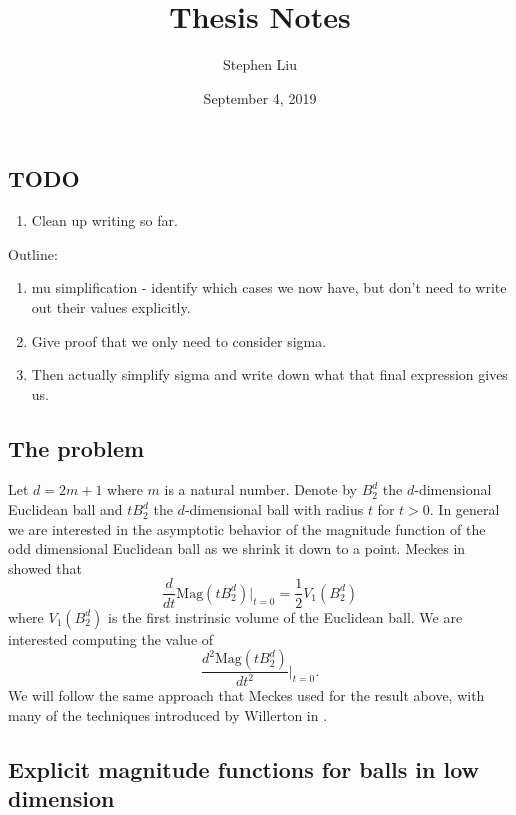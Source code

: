 \documentclass[11pt]{article}
\theoremstyle{definition}
\theoremstyle{definition}
\theoremstyle{plain}
\theoremstyle{plain}
\theoremstyle{plain}
\theoremstyle{definition}
\begin{document}
\author{Stephen Liu}
\title{Thesis Notes}
\date{September 4, 2019}

\maketitle

\subsection*{TODO}
\begin{enumerate}
\item Clean up writing so far.
\end{enumerate}

Outline:
\begin{enumerate}[label=(\alph*)]
\item mu simplification - identify which cases we now have, but don't need to write out their values explicitly.
\item Give proof that we only need to consider sigma.
\item Then actually simplify sigma and write down what that final expression gives us.
\end{enumerate}

\subsection*{The problem}

Let $d = 2m+1$ where $m$ is a natural number. Denote by $B_2^d$ the $d$-dimensional Euclidean ball and $tB_2^d$ the $d$-dimensional ball with radius $t$ for $t > 0$. In general we are interested in the asymptotic behavior of the magnitude function of the odd dimensional Euclidean ball as we shrink it down to a point. Meckes in \cite{meckes_magnitude_2019} showed that
\begin{equation*}
\frac{d}{dt}\text{Mag}(tB_2^d)\big\vert_{t=0} = \frac{1}{2}V_1(B_2^d)
\end{equation*}
where $V_1(B_2^d)$ is the first instrinsic volume of the Euclidean ball.
We are interested computing the value of
\begin{equation*}
\frac{d^2\text{Mag}(tB_2^d)}{dt^2}\big\vert_{t=0}.
\end{equation*}
We will follow the same approach that Meckes used for the result above, with many of the techniques introduced by Willerton in \cite{willerton_magnitude_2017}.

\subsection*{Explicit magnitude functions for balls in low dimension}
\end{document}
